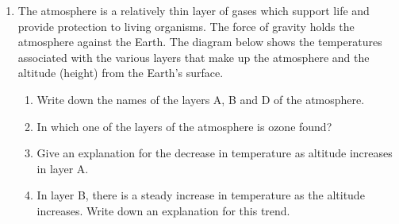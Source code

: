 \begin{eocexercises}{}

\begin{enumerate}

\item{
The atmosphere is a relatively thin layer of gases which support life and provide protection to living organisms. The force of gravity holds the atmosphere against the Earth. The diagram below shows the temperatures associated with the various layers that make up the atmosphere and the altitude (height) from the Earth's surface.

\begin{center}
\end{center}

\begin{enumerate}
\item{Write down the names of the layers A, B and D of the atmosphere.}
\item{In which one of the layers of the atmosphere is ozone found?}
\item{Give an explanation for the decrease in temperature as altitude increases in layer A.}
\item{In layer B, there is a steady increase in temperature as the altitude increases. Write down an explanation for this trend.}
\end{enumerate}
}


\end{enumerate}
\end{eocexercises}

